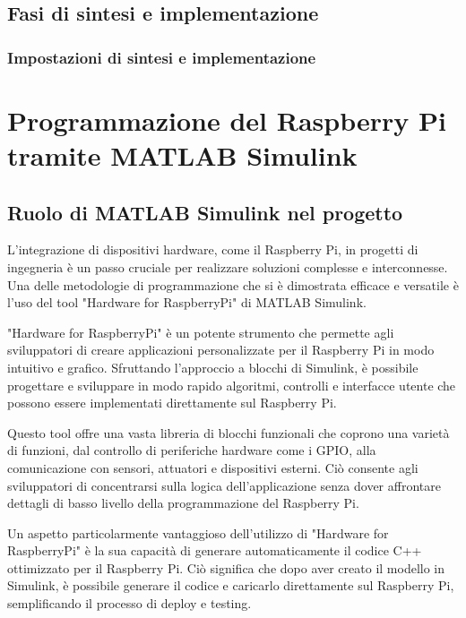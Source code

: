 \documentclass[titlepage]{report}
\begin{document}
	\section{Fasi di sintesi e implementazione}
	\label{sec:fasi_sintesi_implementazione}
		\subsection{Impostazioni di sintesi e implementazione}
		\label{subsec:impostazioni_sintesi}

\chapter{Programmazione del Raspberry Pi tramite MATLAB Simulink}
\label{ch:programmazione_raspberrypi}

	\section{Ruolo di MATLAB Simulink nel progetto}
	\label{sec:ruolo_simulink}

		L'integrazione di dispositivi hardware, come il Raspberry Pi, in progetti di ingegneria è un passo cruciale per realizzare soluzioni complesse e interconnesse. Una delle metodologie di programmazione che si è dimostrata efficace e versatile è l'uso del tool "Hardware for RaspberryPi" di MATLAB Simulink.

		"Hardware for RaspberryPi" è un potente strumento che permette agli sviluppatori di creare applicazioni personalizzate per il Raspberry Pi in modo intuitivo e grafico. Sfruttando l'approccio a blocchi di Simulink, è possibile progettare e sviluppare in modo rapido algoritmi, controlli e interfacce utente che possono essere implementati direttamente sul Raspberry Pi.
		
		Questo tool offre una vasta libreria di blocchi funzionali che coprono una varietà di funzioni, dal controllo di periferiche hardware come i GPIO, alla comunicazione con sensori, attuatori e dispositivi esterni. Ciò consente agli sviluppatori di concentrarsi sulla logica dell'applicazione senza dover affrontare dettagli di basso livello della programmazione del Raspberry Pi.
		
		Un aspetto particolarmente vantaggioso dell'utilizzo di "Hardware for RaspberryPi" è la sua capacità di generare automaticamente il codice C++ ottimizzato per il Raspberry Pi. Ciò significa che dopo aver creato il modello in Simulink, è possibile generare il codice e caricarlo direttamente sul Raspberry Pi, semplificando il processo di deploy e testing.
		
\end{document}
